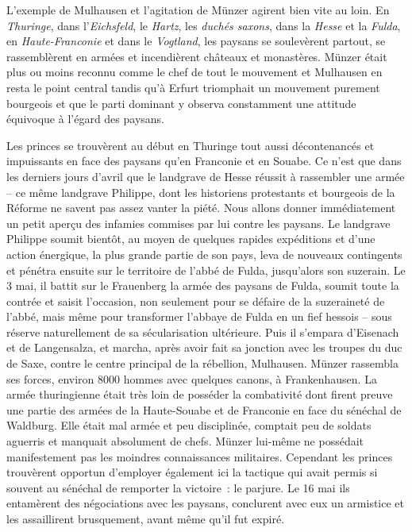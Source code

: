\documentclass[french,twoside]{book} %
\begin{document}
L’exemple de Mulhausen et l’agitation de Münzer agirent bien vite au loin. En \emph{Thuringe}, dans l’\emph{Eichsfeld}, le \emph{Hartz}, les \emph{duchés saxons}, dans la \emph{Hesse} et la \emph{Fulda}, en \emph{Haute-Franconie} et dans le \emph{Vogtland}, les paysans se soulevèrent partout, se rassemblèrent en armées et incendièrent châteaux et monastères. Münzer était plus ou moins reconnu comme le chef de tout le mouvement et Mulhausen en resta le point central tandis qu’à Erfurt triomphait un mouvement purement bourgeois et que le parti dominant y observa constamment une attitude équivoque à l’égard des paysans.\par
Les princes se trouvèrent au début en Thuringe tout aussi décontenancés et impuissants en face des paysans qu’en Franconie et en Souabe. Ce n’est que dans les derniers jours d’avril que le landgrave de Hesse réussit à rassembler une armée – ce même landgrave Philippe, dont les historiens protestants et bourgeois de la Réforme ne savent pas assez vanter la piété. Nous allons donner immédiatement un petit aperçu des infamies commises par lui contre les paysans. Le landgrave Philippe soumit bientôt, au moyen de quelques rapides expéditions et d’une action énergique, la plus grande partie de son pays, leva de nouveaux contingents et pénétra ensuite sur le territoire de l’abbé de Fulda, jusqu’alors son suzerain. Le 3 mai, il battit sur le Frauenberg la armée des paysans de Fulda, soumit toute la contrée et saisit l’occasion, non seulement pour se défaire de la suzeraineté de l’abbé, mais même pour transformer l’abbaye de Fulda en un fief hessois – sous réserve naturellement de sa sécularisation ultérieure. Puis il s’empara d’Eisenach et de Langensalza, et marcha, après avoir fait sa jonction avec les troupes du duc de Saxe, contre le centre principal de la rébellion, Mulhausen. Münzer rassembla ses forces, environ 8000 hommes avec quelques canons, à Frankenhausen. La armée thuringienne était très loin de posséder la combativité dont firent preuve une partie des armées de la Haute-Souabe et de Franconie en face du sénéchal de Waldburg. Elle était mal armée et peu disciplinée, comptait peu de soldats aguerris et manquait absolument de chefs. Münzer lui-même ne possédait manifestement pas les moindres connaissances militaires. Cependant les princes trouvèrent opportun d’employer également ici la tactique qui avait permis si souvent au sénéchal de remporter la victoire : le parjure. Le 16 mai ils entamèrent des négociations avec les paysans, conclurent avec eux un armistice et les assaillirent brusquement, avant même qu’il fut expiré.\par
\end{document}
